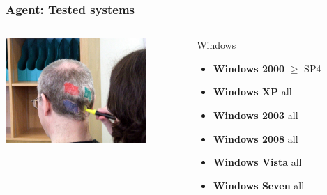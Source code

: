 \documentclass{beamer}
\begin{document}
\begin{frame}
    \frametitle{Agent: Tested systems}

 \begin{columns}
 \begin{column}[T]{4cm}
    \includegraphics[height=4.0cm]{pics/os/windows.jpg}
 \end{column}
 \begin{column}[t]{5cm}
    \begin{block}{Windows}
        \begin{itemize}
            \item \textbf{Windows 2000} $\geq$ SP4
            \item \textbf{Windows XP} all
            \item \textbf{Windows 2003} all
            \item \textbf{Windows 2008} all
            \item \textbf{Windows Vista} all
            \item \textbf{Windows Seven} all
        \end{itemize}
    \end{block}
 \end{column}
\end{columns}

\end{frame}
\end{document}
